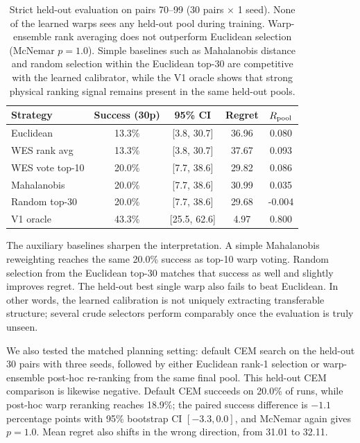 \begin{table}[t]
\centering
\small
\begin{tabular}{lcccc}
\toprule
Strategy & Success (30p) & 95\% CI & Regret & $R_\text{pool}$ \\
\midrule
Euclidean & 13.3\% & [3.8, 30.7] & 36.96 & 0.080 \\
WES rank avg & 13.3\% & [3.8, 30.7] & 37.67 & 0.093 \\
WES vote top-10 & 20.0\% & [7.7, 38.6] & 29.82 & 0.086 \\
Mahalanobis & 20.0\% & [7.7, 38.6] & 30.99 & 0.035 \\
Random top-30 & 20.0\% & [7.7, 38.6] & 29.68 & -0.004 \\
V1 oracle & 43.3\% & [25.5, 62.6] & 4.97 & 0.800 \\
\bottomrule
\end{tabular}
\caption{Strict held-out evaluation on pairs 70--99 (30 pairs $\times$ 1 seed). None of the learned warps sees any held-out pool during training. Warp-ensemble rank averaging does not outperform Euclidean selection (McNemar $p=1.0$). Simple baselines such as Mahalanobis distance and random selection within the Euclidean top-30 are competitive with the learned calibrator, while the V1 oracle shows that strong physical ranking signal remains present in the same held-out pools.}
\label{tab:warp-selection-holdout}
\end{table}

The auxiliary baselines sharpen the interpretation. A simple Mahalanobis reweighting reaches the same 20.0\% success as top-10 warp voting. Random selection from the Euclidean top-30 matches that success as well and slightly improves regret. The held-out best single warp also fails to beat Euclidean. In other words, the learned calibration is not uniquely extracting transferable structure; several crude selectors perform comparably once the evaluation is truly unseen.

We also tested the matched planning setting: default CEM search on the held-out 30 pairs with three seeds, followed by either Euclidean rank-1 selection or warp-ensemble post-hoc re-ranking from the same final pool. This held-out CEM comparison is likewise negative. Default CEM succeeds on 20.0\% of runs, while post-hoc warp reranking reaches 18.9\%; the paired success difference is $-1.1$ percentage points with 95\% bootstrap CI $[-3.3, 0.0]$, and McNemar again gives $p=1.0$. Mean regret also shifts in the wrong direction, from 31.01 to 32.11.

